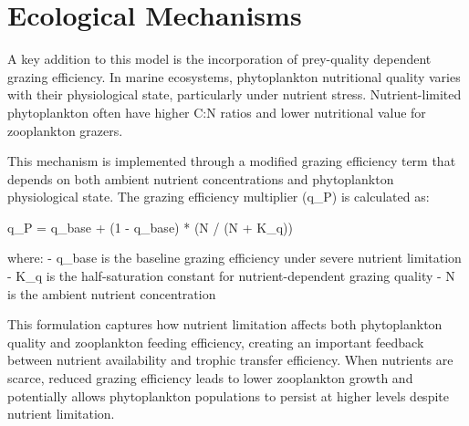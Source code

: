 \section{Ecological Mechanisms}

A key addition to this model is the incorporation of prey-quality dependent grazing efficiency. In marine ecosystems, phytoplankton nutritional quality varies with their physiological state, particularly under nutrient stress. Nutrient-limited phytoplankton often have higher C:N ratios and lower nutritional value for zooplankton grazers.

This mechanism is implemented through a modified grazing efficiency term that depends on both ambient nutrient concentrations and phytoplankton physiological state. The grazing efficiency multiplier (q_P) is calculated as:

q_P = q_base + (1 - q_base) * (N / (N + K_q))

where:
- q_base is the baseline grazing efficiency under severe nutrient limitation
- K_q is the half-saturation constant for nutrient-dependent grazing quality
- N is the ambient nutrient concentration

This formulation captures how nutrient limitation affects both phytoplankton quality and zooplankton feeding efficiency, creating an important feedback between nutrient availability and trophic transfer efficiency. When nutrients are scarce, reduced grazing efficiency leads to lower zooplankton growth and potentially allows phytoplankton populations to persist at higher levels despite nutrient limitation.
